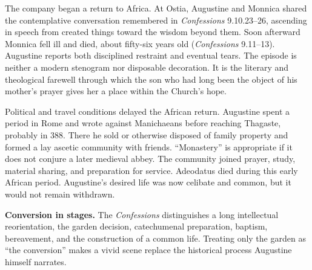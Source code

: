 The company began a return to Africa. At Ostia, Augustine and Monnica shared
the contemplative conversation remembered in \emph{Confessions} 9.10.23--26,
ascending in speech from created things toward the wisdom beyond them. Soon
afterward Monnica fell ill and died, about fifty-six years old
(\emph{Confessions} 9.11--13). Augustine reports both disciplined restraint and
eventual tears. The episode is neither a modern stenogram nor disposable
decoration. It is the literary and theological farewell through which the son
who had long been the object of his mother's prayer gives her a place within
the Church's hope.

Political and travel conditions delayed the African return. Augustine spent a
period in Rome and wrote against Manichaeans before reaching Thagaste, probably
in 388. There he sold or otherwise disposed of family property and formed a
lay ascetic community with friends. “Monastery” is appropriate if it does not
conjure a later medieval abbey. The community joined prayer, study, material
sharing, and preparation for service. Adeodatus died during this early African
period. Augustine's desired life was now celibate and common, but it would not
remain withdrawn.

\begin{studyframe}
\textbf{Conversion in stages.} The \emph{Confessions} distinguishes a long
intellectual reorientation, the garden decision, catechumenal preparation,
baptism, bereavement, and the construction of a common life. Treating only the
garden as “the conversion” makes a vivid scene replace the historical
process Augustine himself narrates.
\end{studyframe}
